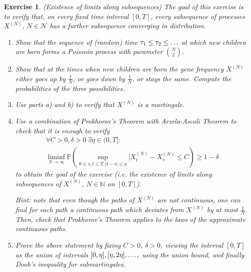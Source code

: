 \documentclass[12pt]{article}
\theoremstyle{colon}
\newtheorem{exercise}{Exercise}
\begin{document}
\begin{exercise}
  (Existence of limits along subsequences) The goal of this exercise is to verify that, on every fixed time interval $[0,T]$, every subsequence of processes $X^{(N)}$, $N \in \mathcal{N}$ has a further subsequence converging in distribution.
  \begin{enumerate}[label=\alph*)]
    \item Show that the sequence of (random) time $\tau_1 \leq \tau_2 \leq \mathellipsis$ at which new children are born forms a Poissoin process with parameter $\binom{N}{2}$.
    \item Show that at the times when new children are born the gene frequency $X^{(N)}$ either goes up by $\frac{1}{N}$, or goes down by $\frac{1}{N}$, or stays the same. Compute the probabilities of the three possibilities.
    \item Use parts a) and b) to verify that $X^{(N)}$ is a martingale.
    \item Use a combination of Prokhorov's Theorem with Arzela-Ascoli Theorem to check that it is enough to verify
      \begin{gather*}
        \forall C > 0, \delta > 0 \ \exists \eta \in (0, T]: \\
        \liminf_{N \rightarrow \infty} \mathbb{P} \left( \sup_{0\leq s, t \leq T, \lvert t - s \rvert \leq \eta} \lvert X_t^{(N)} - X_s^{(N)} \leq C \right) \geq 1 - \delta
      \end{gather*}
      to obtain the goal of the exercise (i.e. the existence of limits along subsequences of $X^{(N)}$, $N \in \mathbb{N}$ on $[0,T]$).

      \textit{Hint:} note that even though the paths of $X^{(N)}$ are not continuous, one can find for each path a continuous path which deviates from $X^{(N)}$ by at most $\frac{1}{N}$. Then, check that Prokhorov's Theorem applies to the laws of the approximate continuous paths.

    \item Prove the above statement by fixing $C > 0$, $\delta > 0$, viewing the interval $[0,T]$ as the union of intervals $[0,\eta], [\eta, 2\eta], \mathellipsis ,$ using the union bound, and finally Doob's inequality for submartingales.
  \end{enumerate}
\end{exercise}

\clearpage
\end{document}

